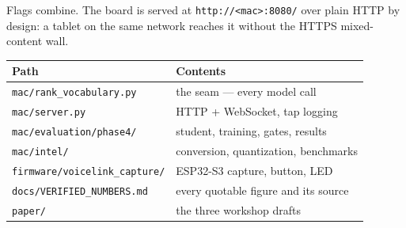 \documentclass[11pt,a4paper]{article}
\newcommand{\code}[1]{\texttt{\small #1}}
\begin{document}
Flags combine. The board is served at \code{http://<mac>:8080/} over plain HTTP by
design: a tablet on the same network reaches it without the HTTPS mixed-content wall.

\begin{center}
\begin{tabular}{@{}ll@{}}
\toprule
\textbf{Path} & \textbf{Contents} \\
\midrule
\code{mac/rank\_vocabulary.py}        & the seam --- every model call \\
\code{mac/server.py}                  & HTTP + WebSocket, tap logging \\
\code{mac/evaluation/phase4/}         & student, training, gates, results \\
\code{mac/intel/}                     & conversion, quantization, benchmarks \\
\code{firmware/voicelink\_capture/}   & ESP32-S3 capture, button, LED \\
\code{docs/VERIFIED\_NUMBERS.md}      & every quotable figure and its source \\
\code{paper/}                         & the three workshop drafts \\
\bottomrule
\end{tabular}
\end{center}
\end{document}
